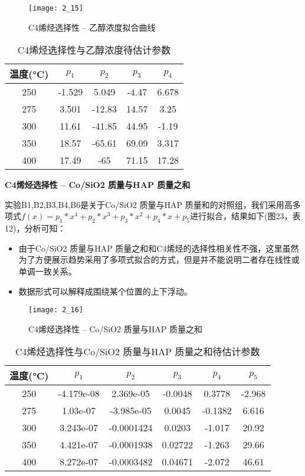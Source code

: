 \documentclass[withoutpreface,bwprint]{cumcmthesis} %
\begin{document}
\begin{figure}[!h]
	\centering
	\texttt{[image: 2\_15]}
	\caption{C4烯烃选择性 -- 乙醇浓度拟合曲线}
	\label{fig:circuit-diagram1}
\end{figure}
\begin{table}[!htbp]
	\caption{C4烯烃选择性与乙醇浓度待估计参数}\label{tab:001} \centering
	\begin{tabular}{ccccc}
		\toprule[1.5pt]
		温度(°C) & $p_1$ & $p_2$ & $p_3$  & $p_4$ \\
		\midrule[1pt]
		250 &  -1.529 &   5.049 &   -4.47 &6.678  \\
		275 & 3.501&   -12.83 & 14.57 &  3.25 \\
		300 &11.61 &  -41.85&  44.95 &-1.19  \\
		350 &18.57 &  -65.61 &  69.09&  3.317  \\
		400 &  17.49 &   -65 &  71.15 &17.28 \\
		\bottomrule[1.5pt]
	\end{tabular}
\end{table}




\newpage
\textbf{C4烯烃选择性 -- Co/SiO2 质量与HAP 质量之和}

实验B1,B2,B3,B4,B6是关于Co/SiO2 质量与HAP 质量和的对照组，我们采用高多项式$f(x) = p_1*x^4 + p_2*x^3 + p_3*x^2 + p_4*x + p_5$进行拟合，结果如下(图23，表12)，分析可知：
\begin{itemize}
	\item 由于Co/SiO2 质量与HAP 质量之和和C4烯烃的选择性相关性不强，这里虽然为了方便展示趋势采用了多项式拟合的方式，但是并不能说明二者存在线性或单调一致关系。
	\item 数据形式可以解释成围绕某个位置的上下浮动。
\end{itemize}
\begin{figure}[!h]
	\centering
	\texttt{[image: 2\_16]}
	\caption{C4烯烃选择性 -- Co/SiO2 质量与HAP 质量之和}
	\label{fig:circuit-diagram1}
\end{figure}

\begin{table}[!htbp]
	\caption{C4烯烃选择性与Co/SiO2 质量与HAP 质量之和待估计参数}\label{tab:001} \centering
	\begin{tabular}{cccccc}
		\toprule[1.5pt]
		温度(°C) & $p_1$ & $p_2$ & $p_3$  & $p_4$ & $p_5$ \\
		\midrule[1pt]
		250 & -4.179e-08 &  2.369e-05 & -0.0048 & 0.3778 & -2.968  \\
		275 & 1.03e-07 & -3.985e-05 & 0.0045&  -0.1382 &6.616 \\
		300 & 3.243e-07 &  -0.0001424 &   0.0203 & -1.017 & 20.92 \\
		350 &4.421e-07 &  -0.0001938 & 0.02722& -1.263 &  29.66 \\
		400 & 8.272e-07  &   -0.0003482 & 0.04671 &  -2.072 &  46.61 \\
		\bottomrule[1.5pt]
	\end{tabular}
\end{table}
\end{document}
